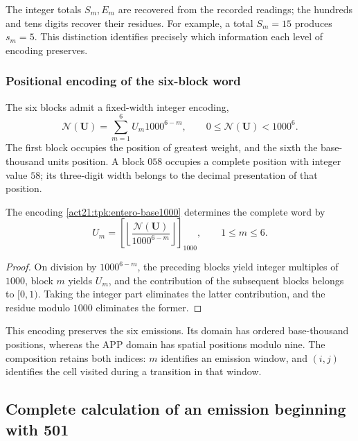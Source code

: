 The integer totals \(S_m,E_m\) are recovered from the recorded readings;
the hundreds and tens digits recover their residues. For example, a total
\(S_m=15\) produces \(s_m=5\). This distinction identifies precisely
which information each level of encoding preserves.

\subsubsection{Positional encoding of the six-block word}

The six blocks admit a fixed-width integer encoding,
\begin{equation}
 \mathscr N(\mathbf U)=\sum_{m=1}^{6}U_m1000^{6-m},
 \qquad0\leq\mathscr N(\mathbf U)<1000^6.
 \label{act21:tpk:entero-base1000}
\end{equation}
The first block occupies the position of greatest weight, and the sixth
the base-thousand units position. A block \(058\) occupies a complete
position with integer value \(58\); its three-digit width belongs to
the decimal presentation of that position.

\begin{proposition}
\label{act21:tpk:inversa-base1000}
The encoding \eqref{act21:tpk:entero-base1000} determines the complete word by
\[
 U_m=\left[\left\lfloor
 \frac{\mathscr N(\mathbf U)}{1000^{6-m}}\right\rfloor\right]_{1000},
 \qquad1\leq m\leq6.
\]
\end{proposition}
\begin{proof}
On division by \(1000^{6-m}\), the preceding blocks yield integer
multiples of \(1000\), block \(m\) yields \(U_m\), and the contribution
of the subsequent blocks belongs to \([0,1)\). Taking the integer part
eliminates the latter contribution, and the residue modulo \(1000\)
eliminates the former.
\end{proof}

This encoding preserves the six emissions. Its domain has ordered
base-thousand positions, whereas the APP domain has spatial positions
modulo nine. The composition retains both indices: \(m\) identifies an
emission window, and \((i,j)\) identifies the cell visited during a
transition in that window.

\subsection{Complete calculation of an emission beginning with 501}
\label{act21:tpk:ejemplo501}


